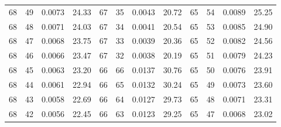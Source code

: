 \begin{tabular}{llll|llll|llll}
68 & 49 & 0.0073 & 24.33 & 67 & 35 & 0.0043 & 20.72 & 65 & 54 & 0.0089 & 25.25\\
68 & 48 & 0.0071 & 24.03 & 67 & 34 & 0.0041 & 20.54 & 65 & 53 & 0.0085 & 24.90\\
68 & 47 & 0.0068 & 23.75 & 67 & 33 & 0.0039 & 20.36 & 65 & 52 & 0.0082 & 24.56\\
68 & 46 & 0.0066 & 23.47 & 67 & 32 & 0.0038 & 20.19 & 65 & 51 & 0.0079 & 24.23\\
68 & 45 & 0.0063 & 23.20 & 66 & 66 & 0.0137 & 30.76 & 65 & 50 & 0.0076 & 23.91\\
68 & 44 & 0.0061 & 22.94 & 66 & 65 & 0.0132 & 30.24 & 65 & 49 & 0.0073 & 23.60\\
68 & 43 & 0.0058 & 22.69 & 66 & 64 & 0.0127 & 29.73 & 65 & 48 & 0.0071 & 23.31\\
68 & 42 & 0.0056 & 22.45 & 66 & 63 & 0.0123 & 29.25 & 65 & 47 & 0.0068 & 23.02\\
\bottomrule
\end{tabular}
\newpage
